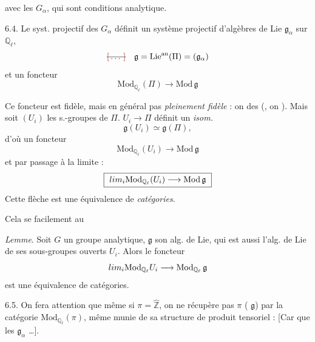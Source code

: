 \documentclass[11pt,a4paper]{article}
\begin{document}
 avec les $G_\alpha$, qui sont  conditions  analytique.

6.4. Le syst. projectif des $G_\alpha$ définit un système projectif d'algèbres
de Lie $\mathfrak{g}_\alpha$ sur $\mathbb{Q}_\ell$,
\[
  \text{\struck{\ill{}}}\quad \mathfrak{g} = \mathrm{Lie}^{\mathrm{an}}(\Pi) = (\mathfrak{g}_\alpha)
\]
et  un foncteur 
\[
  \mathrm{Mod}_{\mathbb{Q}_\ell}(\Pi) \longrightarrow \mathrm{Mod}\,\mathfrak{g}
\]

Ce foncteur est fidèle, mais en général pas \emph{pleinement fidèle} : on
\ill{} des  \ill{} (\ill{}, on  \ill{}). Mais soit
$(U_i)$ les \struck{\ill{}} s.-groupes  de $\Pi$. $U_i \to \Pi$
définit un \emph{isom.}
\[
  \mathfrak{g}(U_i) \simeq \mathfrak{g}(\Pi),
\]
d'où un foncteur
\[
  \mathrm{Mod}_{\mathbb{Q}_\ell}(U_i) \longrightarrow \mathrm{Mod}\,\mathfrak{g}
\]
et par passage à la limite :
\[
  \boxed{\ \varinjlim_i \mathrm{Mod}_{\mathbb{Q}_\ell}(U_i) \longrightarrow \mathrm{Mod}\,\mathfrak{g}\ }
\]
Cette flèche est une équivalence de \emph{catégories}.

Cela se  facilement 
\add{\ill{}}  au

\emph{Lemme}. Soit $G$ un groupe analytique, $\mathfrak{g}$ son alg. de Lie, qui
est aussi l'alg. de Lie de ses sous-groupes ouverts $U_i$. Alors le foncteur
\[
  \varinjlim_i \mathrm{Mod}_{\mathbb{Q}_\ell} U_i \longrightarrow \mathrm{Mod}_{\mathbb{Q}_\ell}\,\mathfrak{g}
\]
est une équivalence de catégories.

6.5. On fera attention \struck{\ill{}} que même si $\pi = \hat{\mathbb{Z}}$,
 \struck{\ill{}} on ne récupère pas $\pi$ (
\ill{}  $\mathfrak{g}$) par la catégorie
$\mathrm{Mod}_{\mathbb{Q}_\ell}(\pi)$, même munie de sa structure de produit
tensoriel : [Car \ill{}  \ill{} que \ill{} 
 \ill{} les $\mathfrak{g}_\alpha$ \ill{} \ill{} \ill{} …].

\end{document}
